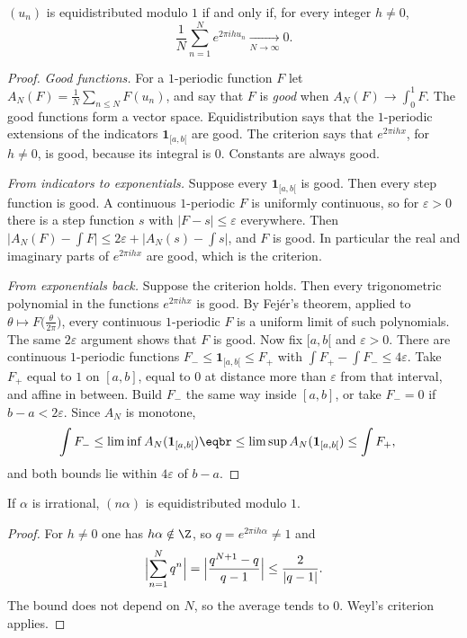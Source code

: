\begin{theorem}\label{thm:weyl}
$(u_n)$ is equidistributed modulo $1$ if and only if, for every integer $h\ne0$,
\[
\frac1N\sum_{n=1}^Ne^{2\pi ihu_n}\xrightarrow[N\to\infty]{}0.
\]
\end{theorem}
\begin{proof}
\emph{Good functions.} For a $1$-periodic function $F$ let $A_N(F)=\frac1N\sum_{n\le N}F(u_n)$, and say that $F$ is \emph{good} when $A_N(F)\to\int_0^1 F$. The good functions form a vector space. Equidistribution says that the $1$-periodic extensions of the indicators $\mathbf 1_{[a,b[}$ are good. The criterion says that $e^{2\pi ihx}$, for $h\ne0$, is good, because its integral is $0$. Constants are always good.

\emph{From indicators to exponentials.} Suppose every $\mathbf 1_{[a,b[}$ is good. Then every step function is good. A continuous $1$-periodic $F$ is uniformly continuous, so for $\varepsilon>0$ there is a step function $s$ with $|F-s|\le\varepsilon$ everywhere. Then $\bigl|A_N(F)-\int F\bigr|\le2\varepsilon+\bigl|A_N(s)-\int s\bigr|$, and $F$ is good. In particular the real and imaginary parts of $e^{2\pi ihx}$ are good, which is the criterion.

\emph{From exponentials back.} Suppose the criterion holds. Then every trigonometric polynomial in the functions $e^{2\pi ihx}$ is good. By Fej\'er's theorem, applied to $\theta\mapsto F\bigl(\frac\theta{2\pi}\bigr)$, every continuous $1$-periodic $F$ is a uniform limit of such polynomials. The same $2\varepsilon$ argument shows that $F$ is good. Now fix $[a,b[$ and $\varepsilon>0$. There are continuous $1$-periodic functions $F_-\le\mathbf 1_{[a,b[}\le F_+$ with $\int F_+-\int F_-\le4\varepsilon$. Take $F_+$ equal to $1$ on $[a,b]$, equal to $0$ at distance more than $\varepsilon$ from that interval, and affine in between. Build $F_-$ the same way inside $[a,b]$, or take $F_-=0$ if $b-a<2\varepsilon$. Since $A_N$ is monotone,
\[
\begin{aligned}\int F_-&\le\liminf A_N(\mathbf 1_{[a,b[})\eqbr\le\limsup A_N(\mathbf 1_{[a,b[})\le\int F_+,\end{aligned}
\]
and both bounds lie within $4\varepsilon$ of $b-a$.
\end{proof}

\begin{corollary}\label{cor:nalpha}
If $\alpha$ is irrational, $(n\alpha)$ is equidistributed modulo $1$.
\end{corollary}
\begin{proof}
For $h\ne0$ one has $h\alpha\notin\Z$, so $q=e^{2\pi ih\alpha}\ne1$ and
\[
\Bigl|\sum_{n=1}^Nq^n\Bigr|=\Bigl|\frac{q^{N+1}-q}{q-1}\Bigr|\le\frac2{|q-1|}.
\]
The bound does not depend on $N$, so the average tends to $0$. Weyl's criterion applies.
\end{proof}

